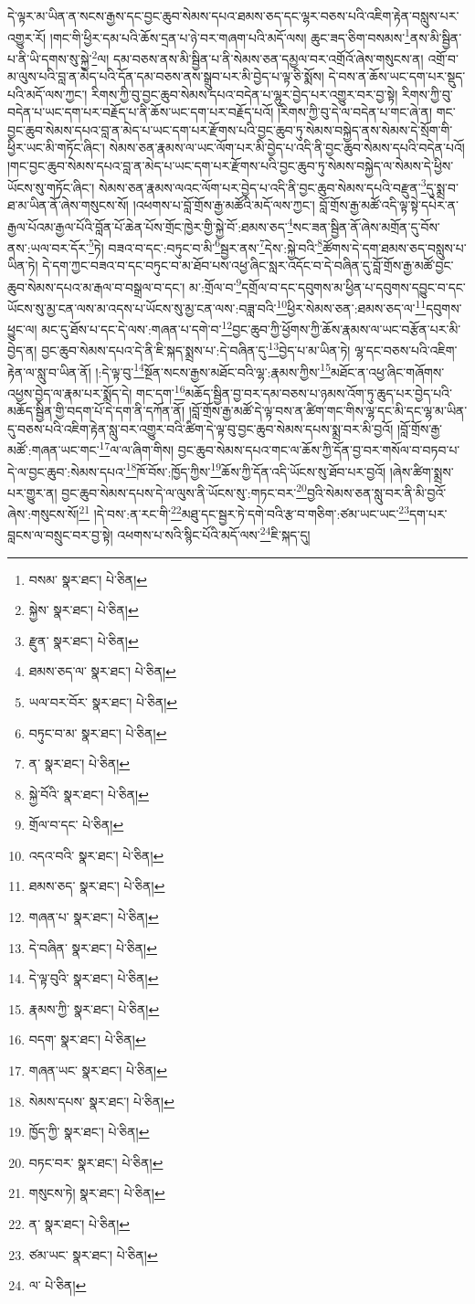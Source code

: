 དེ་ལྟར་མ་ཡིན་ན་སངས་རྒྱས་དང་བྱང་ཆུབ་སེམས་དཔའ་ཐམས་ཅད་དང་ལྷར་བཅས་པའི་འཇིག་རྟེན་བསླུས་པར་འགྱུར་རོ། །གང་གི་ཕྱིར་དམ་པའི་ཆོས་དྲན་པ་ཉེ་བར་གཞག་པའི་མདོ་ལས། ཆུང་ཟད་ཅིག་བསམས་\footnote{བསམ་  སྣར་ཐང་།  པེ་ཅིན། }ནས་མི་སྦྱིན་པ་ནི་ཡི་དགས་སུ་སྐྱེ་\footnote{སྐྱེས་  སྣར་ཐང་།  པེ་ཅིན། }ལ། དམ་བཅས་ནས་མི་སྦྱིན་པ་ནི་སེམས་ཅན་དམྱལ་བར་འགྲོའོ་ཞེས་གསུངས་ན། འགྲོ་བ་མ་ལུས་པའི་བླ་ན་མེད་པའི་དོན་དམ་བཅས་ནས་སྒྲུབ་པར་མི་བྱེད་པ་ལྟ་ཅི་སྨོས། དེ་བས་ན་ཆོས་ཡང་དག་པར་སྡུད་པའི་མདོ་ལས་ཀྱང་། རིགས་ཀྱི་བུ་བྱང་ཆུབ་སེམས་དཔའ་བདེན་པ་ལྷུར་བྱེད་པར་འགྱུར་བར་བྱ་སྟེ། རིགས་ཀྱི་བུ་བདེན་པ་ཡང་དག་པར་བརྗོད་པ་ནི་ཆོས་ཡང་དག་པར་བརྗོད་པའོ། །རིགས་ཀྱི་བུ་དེ་ལ་བདེན་པ་གང་ཞེ་ན། གང་བྱང་ཆུབ་སེམས་དཔའ་བླ་ན་མེད་པ་ཡང་དག་པར་རྫོགས་པའི་བྱང་ཆུབ་ཏུ་སེམས་བསྐྱེད་ནས་སེམས་དེ་སྲོག་གི་ཕྱིར་ཡང་མི་གཏོང་ཞིང་། སེམས་ཅན་རྣམས་ལ་ཡང་ལོག་པར་མི་བྱེད་པ་འདི་ནི་བྱང་ཆུབ་སེམས་དཔའི་བདེན་པའོ། །གང་བྱང་ཆུབ་སེམས་དཔའ་བླ་ན་མེད་པ་ཡང་དག་པར་རྫོགས་པའི་བྱང་ཆུབ་ཏུ་སེམས་བསྐྱེད་ལ་སེམས་དེ་ཕྱིས་ཡོངས་སུ་གཏོང་ཞིང་། སེམས་ཅན་རྣམས་ལའང་ལོག་པར་བྱེད་པ་འདི་ནི་བྱང་ཆུབ་སེམས་དཔའི་བརྫུན་\footnote{རྫུན་  སྣར་ཐང་།  པེ་ཅིན། }དུ་སྨྲ་བ་ཐ་མ་ཡིན་ནོ་ཞེས་གསུངས་སོ། །འཕགས་པ་བློ་གྲོས་རྒྱ་མཚོའི་མདོ་ལས་ཀྱང་། བློ་གྲོས་རྒྱ་མཚོ་འདི་ལྟ་སྟེ་དཔེར་ན་རྒྱལ་པོའམ་རྒྱལ་པོའི་བློན་པོ་ཆེན་པོས་གྲོང་ཁྱེར་གྱི་སྐྱེ་བོ་:ཐམས་ཅད་\footnote{ཐམས་ཅད་ལ་  སྣར་ཐང་།  པེ་ཅིན། }སང་ཟན་སྦྱིན་ནོ་ཞེས་མགྲོན་དུ་བོས་ནས་:ཡལ་བར་དོར་\footnote{ཡལ་བར་བོར་  སྣར་ཐང་།  པེ་ཅིན། }ཏེ། བཟའ་བ་དང་:བཏུང་བ་མི་\footnote{བཏུང་བ་མ་  སྣར་ཐང་།  པེ་ཅིན། }སྦྱར་ནས་\footnote{ན་  སྣར་ཐང་།  པེ་ཅིན། }དེས་:སྐྱེ་བའི་\footnote{སྐྱེ་བོའི་  སྣར་ཐང་།  པེ་ཅིན། }ཚོགས་དེ་དག་ཐམས་ཅད་བསླུས་པ་ཡིན་ཏེ། དེ་དག་ཀྱང་བཟའ་བ་དང་བཏུང་བ་མ་ཐོབ་པས་འཕྱ་ཞིང་སླར་འདོང་བ་དེ་བཞིན་དུ་བློ་གྲོས་རྒྱ་མཚོ་བྱང་ཆུབ་སེམས་དཔའ་མ་རྒལ་བ་བསྒྲལ་བ་དང་། མ་:གྲོལ་བ་\footnote{གྲོལ་བ་དང་  པེ་ཅིན། }དགྲོལ་བ་དང་དབུགས་མ་ཕྱིན་པ་དབུགས་དབྱུང་བ་དང་ཡོངས་སུ་མྱ་ངན་ལས་མ་འདས་པ་ཡོངས་སུ་མྱ་ངན་ལས་:བཟླ་བའི་\footnote{འདའ་བའི་  སྣར་ཐང་།  པེ་ཅིན། }ཕྱིར་སེམས་ཅན་:ཐམས་ཅད་ལ་\footnote{ཐམས་ཅད་  སྣར་ཐང་།  པེ་ཅིན། }དབུགས་ཕྱུང་ལ། མང་དུ་ཐོས་པ་དང་དེ་ལས་:གཞན་པ་དགེ་བ་\footnote{གཞན་པ་  སྣར་ཐང་།  པེ་ཅིན། }བྱང་ཆུབ་ཀྱི་ཕྱོགས་ཀྱི་ཆོས་རྣམས་ལ་ཡང་བརྩོན་པར་མི་བྱེད་ན། བྱང་ཆུབ་སེམས་དཔའ་དེ་ནི་ཇི་སྐད་སྨྲས་པ་:དེ་བཞིན་དུ་\footnote{དེ་བཞིན་  སྣར་ཐང་།  པེ་ཅིན། }བྱེད་པ་མ་ཡིན་ཏེ། ལྷ་དང་བཅས་པའི་འཇིག་རྟེན་ལ་སླུ་བ་ཡིན་ནོ། །:དེ་ལྟ་བུ་\footnote{དེ་ལྟ་བུའི་  སྣར་ཐང་།  པེ་ཅིན། }སྔོན་སངས་རྒྱས་མཐོང་བའི་ལྷ་:རྣམས་ཀྱིས་\footnote{རྣམས་ཀྱི་  སྣར་ཐང་།  པེ་ཅིན། }མཐོང་ན་འཕྱ་ཞིང་གཞོགས་འཕྱས་བྱེད་ལ་རྣམ་པར་སྨོད་དེ། གང་དག་\footnote{བདག་  སྣར་ཐང་།  པེ་ཅིན། }མཆོད་སྦྱིན་བྱ་བར་དམ་བཅས་པ་ཉམས་འོག་ཏུ་ཆུད་པར་བྱེད་པའི་མཆོད་སྦྱིན་གྱི་བདག་པོ་དེ་དག་ནི་དཀོན་ནོ། །བློ་གྲོས་རྒྱ་མཚོ་དེ་ལྟ་བས་ན་ཚིག་གང་གིས་ལྷ་དང་མི་དང་ལྷ་མ་ཡིན་དུ་བཅས་པའི་འཇིག་རྟེན་སླུ་བར་འགྱུར་བའི་ཚིག་དེ་ལྟ་བུ་བྱང་ཆུབ་སེམས་དཔས་སྨྲ་བར་མི་བྱའོ། །བློ་གྲོས་རྒྱ་མཚོ་:གཞན་ཡང་གང་\footnote{གཞན་ཡང་  སྣར་ཐང་།  པེ་ཅིན། }ལ་ལ་ཞིག་གིས། བྱང་ཆུབ་སེམས་དཔའ་གང་ལ་ཆོས་ཀྱི་དོན་བྱ་བར་གསོལ་བ་བཏབ་པ་དེ་ལ་བྱང་ཆུབ་:སེམས་དཔའ་\footnote{སེམས་དཔས་  སྣར་ཐང་།  པེ་ཅིན། }ཁོ་བོས་:ཁྱོད་ཀྱིས་\footnote{ཁྱོད་ཀྱི་  སྣར་ཐང་།  པེ་ཅིན། }ཆོས་ཀྱི་དོན་འདི་ཡོངས་སུ་ཐོབ་པར་བྱའོ། །ཞེས་ཚིག་སྨྲས་པར་གྱུར་ན། བྱང་ཆུབ་སེམས་དཔས་དེ་ལ་ལུས་ནི་ཡོངས་སུ་:གཏང་བར་\footnote{བཏང་བར་  སྣར་ཐང་།  པེ་ཅིན། }བྱའི་སེམས་ཅན་སླུ་བར་ནི་མི་བྱའོ་ཞེས་:གསུངས་སོ།\footnote{གསུངས་ཏེ།  སྣར་ཐང་།  པེ་ཅིན། } །དེ་བས་:ན་རང་གི་\footnote{ན་  སྣར་ཐང་།  པེ་ཅིན། }མཐུ་དང་སྦྱར་ཏེ་དགེ་བའི་རྩ་བ་གཅིག་:ཙམ་ཡང་ཡང་\footnote{ཙམ་ཡང་  སྣར་ཐང་།  པེ་ཅིན། }དག་པར་བླངས་ལ་བསྲུང་བར་བྱ་སྟེ། འཕགས་པ་སའི་སྙིང་པོའི་མདོ་ལས་\footnote{ལ་  པེ་ཅིན། }ཇི་སྐད་དུ། 